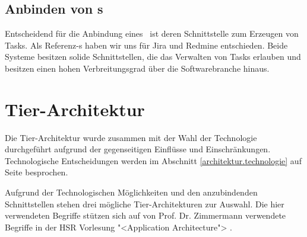 		
		\subsection{Anbinden von \ppt s}
			Entscheidend für die Anbindung eines \ppt\ ist deren Schnittstelle zum Erzeugen von Tasks. 
			Als Referenz-\ppt s haben wir uns für Jira und Redmine entschieden.
			Beide Systeme besitzen solide Schnittstellen,
			die das Verwalten von Tasks erlauben 
			und besitzen einen hohen Verbreitungsgrad über die Softwarebranche hinaus.
		

	\section{Tier-Architektur}
		Die Tier-Architektur wurde zusammen mit der Wahl der Technologie durchgeführt aufgrund der gegenseitigen Einflüsse und Einschränkungen.
		Technologische Entscheidungen werden im Abschnitt \ref{architektur.technologie} auf 
Seite \pageref{architektur.technologie} besprochen.
		
		Aufgrund der Technologischen Möglichkeiten und den anzubindenden Schnittstellen stehen drei mögliche Tier-Architekturen zur Auswahl.
		Die hier verwendeten Begriffe stützen sich auf von Prof. Dr. Zimmermann verwendete Begriffe in der HSR Vorlesung "<Application Architecture"> \cite{prof._dr._zimmerman_layers_2014}.		
		
